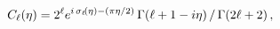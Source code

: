 \[\mathop{C_{\ell}\/}\nolimits\!\left(\eta\right)=2^{\ell}e^{i\mathop{{\sigma_{%
\ell}}\/}\nolimits\!\left(\eta\right)-(\pi\eta/2)}\mathop{\Gamma\/}\nolimits\!%
\left(\ell+1-i\eta\right)/\mathop{\Gamma\/}\nolimits\!\left(2\ell+2\right),\]